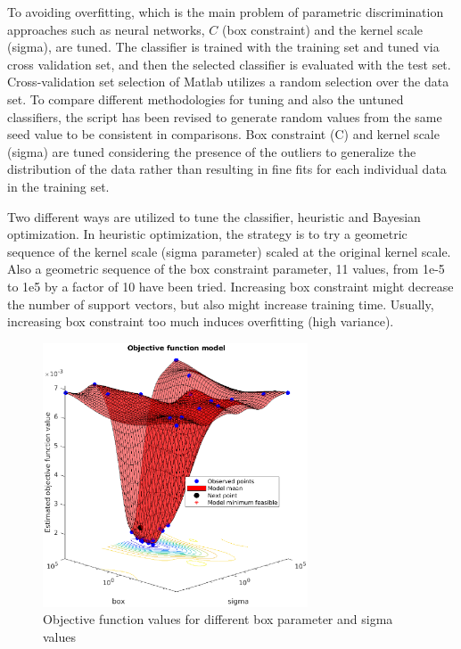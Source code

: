To avoiding overfitting, which is the main problem of parametric discrimination approaches such as neural networks, $C$ (box constraint) and the kernel scale (sigma), are tuned.
The classifier is trained with the training set and tuned via cross validation set, and then the selected classifier is evaluated with the test set. Cross-validation set selection of Matlab utilizes a random selection over the data set. 
To compare different methodologies for tuning and also the untuned classifiers, the script has been revised to generate random values from the same seed value to be consistent in comparisons.
Box constraint (C) and kernel scale (sigma) are tuned considering the presence of the outliers to generalize the distribution of the data rather than resulting in fine fits for each individual data in the training set. 

Two different ways are utilized to tune the classifier, heuristic and Bayesian optimization. In heuristic optimization, the strategy is to try a geometric sequence of the kernel scale (sigma parameter) scaled at the original kernel scale.  
Also a geometric sequence of the box constraint parameter, 11 values, from 1e-5 to 1e5 by a factor of 10 have been tried. Increasing box constraint might decrease the number of support vectors, but also might increase training time. 
Usually, increasing box constraint too much induces overfitting (high variance). 

\begin{figure}
\begin{center}
\includegraphics[width=0.7\textwidth]{figures/objFuncModel}    %
\caption{Objective function values for different box parameter and sigma values} 
\label{fig:objFuncModel}
\end{center}
\end{figure}


